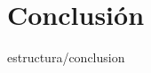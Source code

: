 \documentclass[epsbased,copyright,final,printable,covers,extendedindex,firstnumbered,tfg,gnuplot]{tfgtfmthesisuam}
\begin{document}
\chapter{Conclusión\label{CAP:CONCLUSION}}{estructura/conclusion}
%


%
%
%
%
%
\end{document}
